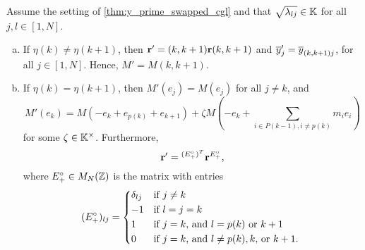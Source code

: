 \begin{theorem}\label{thm:almost_mutation_toric_frame}

	Assume the setting of \cref{thm:y_prime_swapped_cgl} and that $\sqrt{\lambda_{lj}}\in
		\mathbb{K}$ for all $j, l \in [1, N]$.
	\begin{enumerate}[(a)]
		\item If $\eta(k) \neq \eta(k+1)$, then $\mathbf{r}' = (k, k+1)\mathbf{r} (k, k+1)$ and $\overline{y}'_j =
			      \overline{y}_{(k, k+1)j}$, for all $j \in [1, N]$. Hence, $M' = M(k, k+1)$.
		\item If $\eta(k) = \eta(k+1)$, then $M'(e_j) = M(e_j)$ for all $j \neq k$, and
		      \begin{equation}\label{eq:M'_of_ek}
			      M'(e_k) = M(-e_k + e_{p(k)} + e_{k+1}) + \zeta M\left(-e_k + \sum_{i \in P(k-1), i\neq p(k)}m_ie_i\right)
		      \end{equation}
		      for some $\zeta \in \mathbb{K}^\times$. Furthermore,
		      \begin{equation*}
			      \mathbf{r}' = \prescript{(E_{+}^\circ)^T}{}{\mathbf{r}}^{E^\circ_{+}},
		      \end{equation*}
		      where $E^\circ_{+}\in M_N(\mathbb{Z})$ is the matrix with entries
		      \begin{equation*}
			      (E^\circ_{+})_{lj} = \begin{dcases*}
				      \delta_{lj} & if $j \neq k$                               \\
				      -1          & if $l = j = k$                              \\
				      1           & if $j=k$, and $l= p(k)$ or $k+1$            \\
				      0           & if $j = k$, and $l \neq p(k), k,$ or $k+1$.
			      \end{dcases*}
		      \end{equation*}
	\end{enumerate}
\end{theorem}
